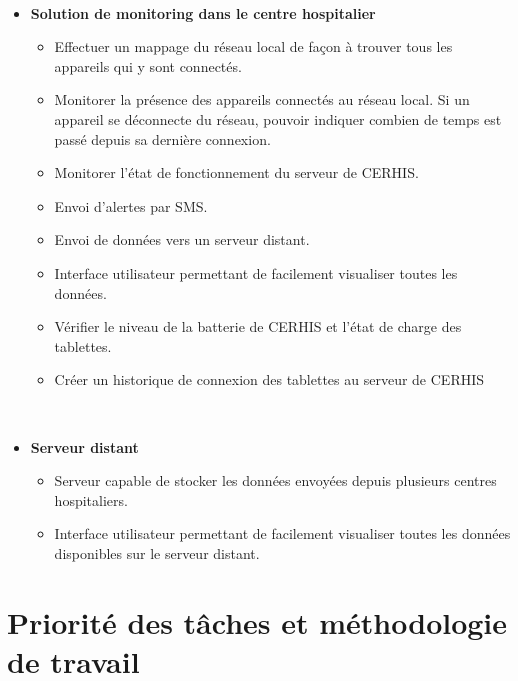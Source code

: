 ~

\begin{itemize}
  \item \textbf{Solution de monitoring dans le centre hospitalier}
  \begin{itemize}
    \item Effectuer un mappage du réseau local de façon à trouver tous les appareils qui y sont connectés.

    \item Monitorer la présence des appareils connectés au réseau local. Si un appareil se déconnecte du réseau, pouvoir indiquer combien de temps est passé depuis sa dernière connexion.

    \item Monitorer l'état de fonctionnement du serveur de CERHIS.

    \item Envoi d'alertes par SMS.

    \item Envoi de données vers un serveur distant.

    \item Interface utilisateur permettant de facilement visualiser toutes les données.

    \item Vérifier le niveau de la batterie de CERHIS et l'état de charge des tablettes.

    \item Créer un historique de connexion des tablettes au serveur de CERHIS
  \end{itemize}

~

  \item \textbf{Serveur distant}
  \begin{itemize}
    \item Serveur capable de stocker les données envoyées depuis plusieurs centres hospitaliers.

    \item Interface utilisateur permettant de facilement visualiser toutes les données disponibles sur le serveur distant.
  \end{itemize}
\end{itemize}



\section{Priorité des tâches et méthodologie de travail}

